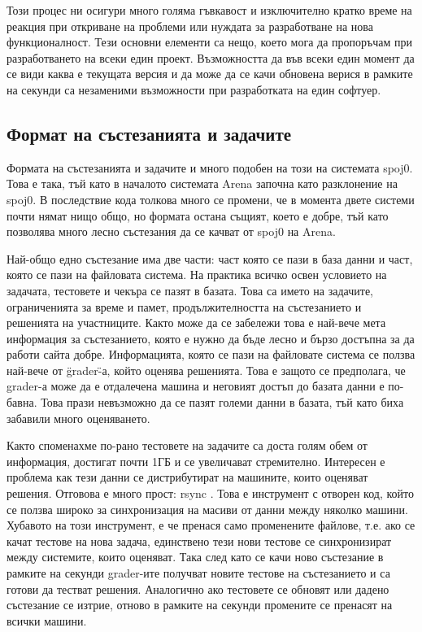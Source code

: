 \documentclass[a4paper,12pt]{article}
\begin{document}
    Този процес ни осигури много голяма гъвкавост и изключително кратко време на реакция при откриване на проблеми или нуждата за разработване на нова функционалност. Тези основни елементи са нещо, което мога да пропоръчам при разработването на всеки един проект. Възможността да във всеки един момент да се види каква е текущата версия и да може да се качи обновена верися в рамките на секунди са незаменими възможности при разработката на един софтуер.
  \subsection{Формат на състезанията и задачите}                              
    Формата на състезанията и задачите и много подобен на този на системата spoj0. Това е така, тъй като в началото системата Arena започна като разклонение на spoj0. В последствие кода толкова много се промени, че в момента двете системи почти нямат нищо общо, но формата остана същият, което е добре, тъй като позволява много лесно състезания да се качват от spoj0 на Arena.
    
    Най-общо едно състезание има две части: част която се пази в база данни и част, която се пази на файловата система. На практика всичко освен условието на задачата, тестовете и чекъра се пазят в базата. Това са името на задачите, ограниченията за време и памет, продължителността на състезанието и решенията на участниците. Както може да се забележи това е най-вече мета информация за състезанието, която е нужно да бъде лесно и бързо достъпна за да работи сайта добре. Информацията, която се пази на файловате система се ползва най-вече от \"grader\"-а, който оценява решенията. Това е защото се предполага, че grader-а може да е отдалечена машина и неговият достъп до базата данни е по-бавна. Това прази невъзможно да се пазят големи данни в базата, тъй като биха забавили много оценяването.
    
    Както споменахме по-рано тестовете на задачите са доста голям обем от информация, достигат почти 1ГБ и се увеличават стремително. Интересен е проблема как тези данни се дистрибутират на машините, които оценяват решения. Отговова е много прост: rsync \cite{rsync_site}. Това е инструмент с отворен код, който се ползва широко за синхронизация на масиви от данни между няколко машини. Хубавото на този инструмент, е че пренася само променените файлове, т.е. ако се качат тестове на нова задача, единствено тези нови тестове се синхронизират между системите, които оценяват. Така след като се качи ново състезание в рамките на секунди grader-ите получват новите тестове на състезанието и са готови да тестват решения. Аналогично ако тестовете се обновят или дадено състезание се изтрие, отново в рамките на секунди промените се пренасят на всички машини.
    
\end{document}
